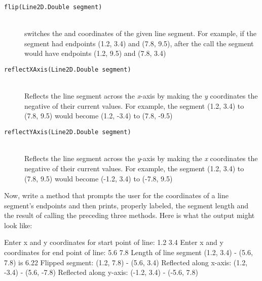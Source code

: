 \begin{exercise}
\begin{description}
  \item[\texttt{flip(Line2D.Double segment)}] \hfill \\ switches the  and  coordinates of the given line segment. For example, if the segment had endpoints (1.2, 3.4) and (7.8, 9.5), after the call the segment would have endpoints (1.2, 9.5) and (7.8, 3.4)
  \item[\texttt{reflectXAxis(Line2D.Double segment)}] \hfill \\ Reflects the line segment across the {\em x}-axis by making the {\em y} coordinates the negative of their current values. For example, the segment (1.2, 3.4) to (7.8, 9.5) would become (1.2, -3.4) to (7.8, -9.5)
  \item[\texttt{reflectYAxis(Line2D.Double segment)}] \hfill \\ Reflects the line segment across the {\em y}-axis by making the {\em x} coordinates the negative of their current values. For example, the segment (1.2, 3.4) to (7.8, 9.5) would become (-1.2, 3.4) to (-7.8, 9.5)
\end{description}

Now, write a  method that prompts the user for the coordinates of a line segment's endpoints and then prints, properly labeled, the segment length and the result of calling the preceding three methods. Here is what the output might look like:

\begin{stdout}
Enter x and y coordinates for start point of line: 1.2 3.4
Enter x and y coordinates for end point of line: 5.6 7.8
Length of line segment (1.2, 3.4) - (5.6, 7.8) is 6.22
Flipped segment: (1.2, 7.8) - (5.6, 3.4)
Reflected along x-axis: (1.2, -3.4) - (5.6, -7.8)
Reflected along y-axis: (-1.2, 3.4) - (-5.6, 7.8)
\end{stdout}

\end{exercise}

